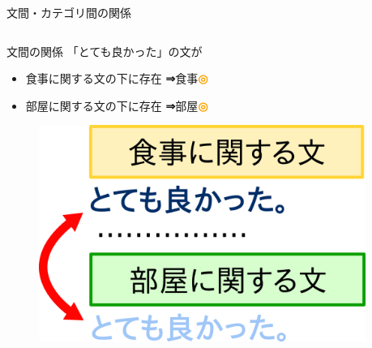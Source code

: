 \documentclass[aspectratio=43,unicode,10pt]{beamer}
\newcommand{\then}{\textcolor{ttiblue}{\textbf{⇒}}\hspace{1ex}}
\newcommand{\good}{\textcolor{orange}{\textbf{◎}}\hspace{1ex}}
\begin{document}
\begin{frame}{文間・カテゴリ間の関係}{}
  \begin{columns}[t]
    \begin{column}{0.6\textwidth}
      \begin{block}{文間の関係}
        「とても良かった」の文が
        \begin{itemize}
          \item 食事に関する文の下に存在 \then 食事\good
          \item 部屋に関する文の下に存在 \then 部屋\good
        \end{itemize}
        \begin{figure}
          \includegraphics[width=0.8\linewidth]
                          {fig/global_relations_among_sentences_v2.png}
        \end{figure}
      \end{block}
    \end{column}
    \begin{column}{0.4\textwidth}
\end{column}
\end{columns}
\end{frame}
\end{document}
